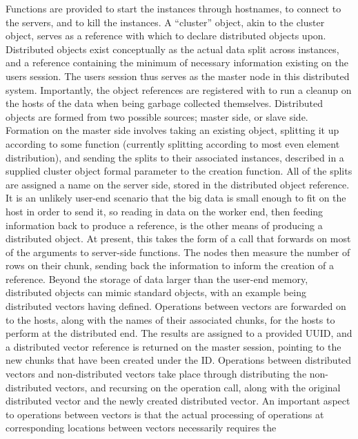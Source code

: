 Functions are provided to start the instances through hostnames, to
connect to the servers, and to kill the instances. A ``cluster'' object,
akin to the  cluster object, serves as a reference with which
to declare distributed objects upon. Distributed objects exist
conceptually as the actual data split across  instances, and a
reference containing the minimum of necessary information existing on
the users \R{} session. The users \R{} session thus serves as the master node
in this distributed system. Importantly, the object references are
registered with  to run a cleanup on the hosts of
the data when being garbage collected themselves. Distributed objects
are formed from two possible sources; master side, or slave side.
Formation on the master side involves taking an existing \R{} object,
splitting it up according to some function (currently splitting
according to most even element distribution), and sending the splits to
their associated  instances, described in a supplied cluster
object formal parameter to the creation function. All of the splits are
assigned a name on the server side, stored in the distributed object
reference. It is an unlikely user-end scenario that the big data is
small enough to fit on the host in order to send it, so reading in data
on the worker end, then feeding information back to produce a reference,
is the other means of producing a distributed object. At present, this
takes the form of a  call that forwards on
most of the arguments to server-side  functions. The
nodes then measure the number of rows on their chunk, sending back the
information to inform the creation of a reference. Beyond the storage of
data larger than the user-end memory, distributed objects can mimic
standard \R{} objects, with an example being distributed vectors having
 defined. Operations between vectors are forwarded on to the
hosts, along with the names of their associated chunks, for the hosts to
perform at the distributed end. The results are assigned to a provided
UUID, and a distributed vector reference is returned on the master
session, pointing to the new chunks that have been created under the ID.
Operations between distributed vectors and non-distributed vectors take
place through distributing the non-distributed vectors, and recursing on
the operation call, along with the original distributed vector and the
newly created distributed vector. An important aspect to operations
between vectors is that the actual processing of operations at
corresponding locations between vectors necessarily requires the
